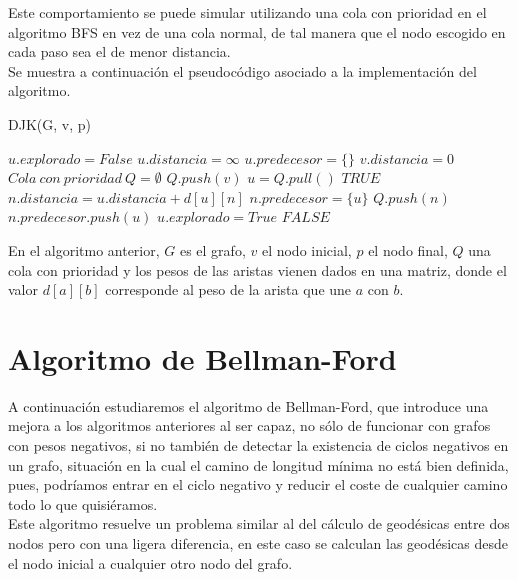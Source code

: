 Este comportamiento se puede simular utilizando una cola con prioridad en el algoritmo BFS en vez de una cola normal, de tal manera que el nodo escogido en cada paso sea el de menor distancia. \\

Se muestra a continuación el pseudocódigo asociado a la implementación del algoritmo.

\begin{breakablealgorithm}
	\caption{DJK(G, v, p)}
	\begin{algorithmic}[1]
			\State $u.explorado = False$
			\State $u.distancia = \infty$
			\State $u.predecesor = \{\}$
		\EndFor
		\State $v.distancia = 0$
		\State $Cola\ con\ prioridad\ Q = \emptyset$
		\State $Q.push(v)$
			\State $u = Q.pull()$
				\Return $TRUE$
			\EndIf
						\State $n.distancia = u.distancia + d[u][n]$
						\State $n.predecesor = \{u\}$
						\State $Q.push(n)$
					\ElsIf{$n.distancia == u.distancia + d[u][n]$}
						\State $n.predecesor.push(u)$
					\EndIf
				\EndIf
			\EndFor
			\State $u.explorado = True$
		\EndWhile
		\Return $FALSE$
	\end{algorithmic}
\end{breakablealgorithm}

En el algoritmo anterior, $G$ es el grafo, $v$ el nodo inicial, $p$ el nodo final, $Q$ una cola con prioridad y los pesos de las aristas vienen dados en una matriz, donde el valor $d[a][b]$ corresponde al peso de la arista que une $a$ con $b$.

\section{Algoritmo de Bellman-Ford}\label{Bellman-Ford}

A continuación estudiaremos el algoritmo de Bellman-Ford, que introduce una mejora a los algoritmos anteriores al ser capaz, no sólo de funcionar con grafos con pesos negativos, si no también de detectar la existencia de ciclos negativos en un grafo, situación en la cual el camino de longitud mínima no está bien definida, pues, podríamos entrar en el ciclo negativo y reducir el coste de cualquier camino todo lo que quisiéramos. \\

Este algoritmo resuelve un problema similar al del cálculo de geodésicas entre dos nodos pero con una ligera diferencia, en este caso se calculan las geodésicas desde el nodo inicial a cualquier otro nodo del grafo. \\

